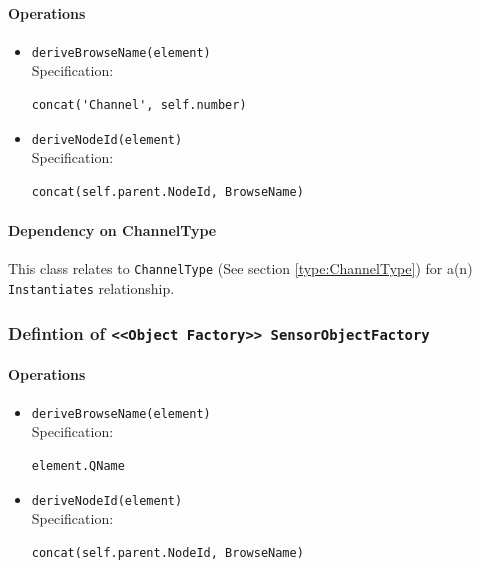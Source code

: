 \paragraph{Operations}
\begin{itemize}
  \item \texttt{deriveBrowseName(element)}\\
    Specification:
   \indent \begin{lstlisting}
concat('Channel', self.number)
\end{lstlisting}

  \item \texttt{deriveNodeId(element)}\\
    Specification:
   \indent \begin{lstlisting}
concat(self.parent.NodeId, BrowseName)
\end{lstlisting}

\end{itemize}
\paragraph{Dependency on ChannelType}

This class relates to \texttt{ChannelType} (See section \ref{type:ChannelType}) for a(n) \texttt{Instantiates} relationship.

\FloatBarrier
\subsubsection{Defintion of \texttt{<<Object Factory>> SensorObjectFactory}} \label{type:SensorObjectFactory}

\FloatBarrier



\paragraph{Operations}
\begin{itemize}
  \item \texttt{deriveBrowseName(element)}\\
    Specification:
   \indent \begin{lstlisting}
element.QName
\end{lstlisting}

  \item \texttt{deriveNodeId(element)}\\
    Specification:
   \indent \begin{lstlisting}
concat(self.parent.NodeId, BrowseName)
\end{lstlisting}

\end{itemize}
